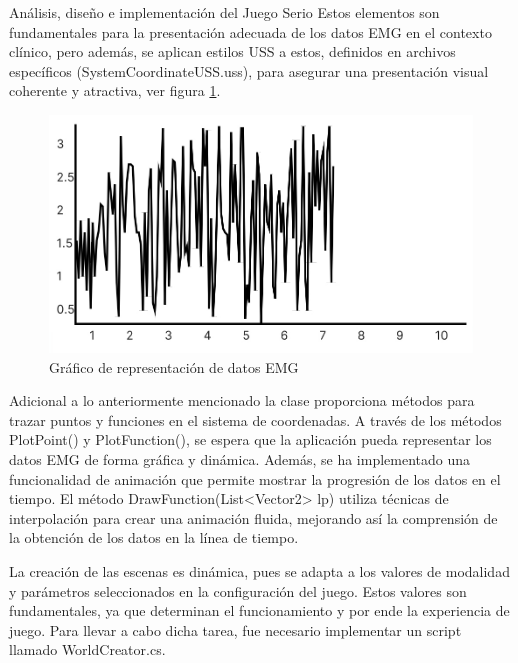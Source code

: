 \begin{thesischapter}{2} {Análisis, diseño e implementación del Juego Serio}
    \vspace{5pt}
    Estos elementos son fundamentales para la presentación adecuada de los datos EMG en el contexto clínico, pero además, se aplican estilos USS a estos, definidos en archivos específicos (SystemCoordinateUSS.uss), para asegurar una 
    presentación visual coherente y atractiva, ver figura \ref{fig: graph-emg}.

    \begin{figure}[ht]
        \centering
        \includegraphics[scale=0.25]{images/emg-graph.jpg}
        \caption{Gráfico de representación de datos EMG}
        \label{fig: graph-emg}
    \end{figure}

    \vspace{10pt}
    Adicional a lo anteriormente mencionado la clase proporciona métodos para trazar puntos y funciones en el sistema de coordenadas. A través de los métodos PlotPoint() y PlotFunction(), se espera que la 
    aplicación pueda representar los datos EMG de forma gráfica y dinámica. Además, se ha implementado una funcionalidad de animación que permite mostrar la progresión de los datos en el tiempo. El método 
    DrawFunction(List<Vector2> lp) utiliza técnicas de interpolación para crear una animación fluida, mejorando así la comprensión de la obtención de los datos en la línea de tiempo.

    \newpage    
    La creación de las escenas es dinámica, pues se adapta a los valores de 
    modalidad y parámetros seleccionados en la configuración del juego. Estos valores son fundamentales, ya que 
    determinan el funcionamiento y por ende la experiencia de juego. Para llevar a cabo dicha tarea, fue necesario implementar un script 
    llamado WorldCreator.cs.


\end{thesischapter}
